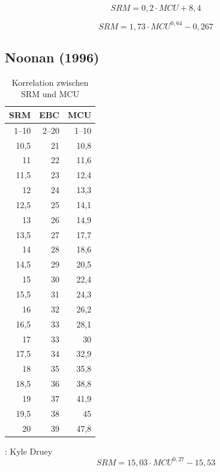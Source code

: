 \documentclass[a4paper,parskip=half]{scrartcl}
\newcommand{\MCU}{\mathit{MCU}}
\newcommand{\SRM}{\mathit{SRM}}
\begin{document}
\begin{equation}
\SRM = 0,2 \cdot \MCU + 8,4
\label{eq:mcudaniels}
\end{equation}

\begin{equation}
\SRM = 1,73 \cdot \MCU^{0,64} - 0,267
\label{eq:mcudanielsdruey}
\end{equation}

\subsection*{Noonan (1996)}

\begin{table}[H]
\centering
\begin{tabular}{rrr}
\toprule
\multicolumn{1}{c}{\textbf{SRM}} & \multicolumn{1}{c}{\textbf{EBC}} & \multicolumn{1}{c}{\textbf{MCU}} \\
\midrule
1–10 & 2–20 & 1–10 \\
10,5 & 21 & 10,8 \\
11   & 22 & 11,6 \\
11,5 & 23 & 12,4 \\
12   & 24 & 13,3 \\
12,5 & 25 & 14,1 \\
13   & 26 & 14,9 \\
13,5 & 27 & 17,7 \\
14   & 28 & 18,6 \\
14,5 & 29 & 20,5 \\
15   & 30 & 22,4 \\
15,5 & 31 & 24,3 \\
16   & 32 & 26,2 \\
16,5 & 33 & 28,1 \\
17   & 33 & 30 \\
17,5 & 34 & 32,9 \\
18   & 35 & 35,8 \\
18,5 & 36 & 38,8 \\
19   & 37 & 41,9 \\
19,5 & 38 & 45 \\
20   & 39 & 47,8 \\
\bottomrule
\end{tabular}
\caption{Korrelation zwischen SRM und MCU \parencite[206]{Noonan1996}}
\label{table:mcunoonan}
\end{table}

\parencite{Druey1998}:
Kyle Druey
\begin{equation}
\SRM = 15,03 \cdot \MCU^{0,27} - 15,53
\label{eq:mcunoonandruey}
\end{equation}
\end{document}
